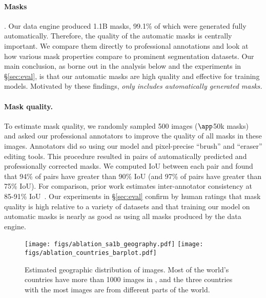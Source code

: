 \paragraph{Masks}. Our data engine produced 1.1B masks, 99.1\% of which were generated fully automatically. Therefore, the quality of the automatic masks is centrally important. We compare them directly to professional annotations and look at how various mask properties compare to prominent segmentation datasets. Our main conclusion, as borne out in the analysis below and the experiments in \S\ref{sec:eval}, is that our automatic masks are high quality and effective for training models. Motivated by these findings, \sad \emph{only includes automatically generated masks.}

\paragraph{Mask quality.} To estimate mask quality, we randomly sampled 500 images ($\app$50k masks) and asked our professional annotators to improve the quality of all masks in these images. Annotators did so using our model and pixel-precise ``brush'' and ``eraser'' editing tools. This procedure resulted in pairs of automatically predicted and professionally corrected masks. We computed IoU between each pair and found that 94\% of pairs have greater than 90\% IoU (and 97\% of pairs have greater than 75\% IoU). For comparison, prior work estimates inter-annotator consistency at 85-91\% IoU~\cite{Gupta2019,OpenImages}. Our experiments in \S\ref{sec:eval} confirm by human ratings that mask quality is high relative to a variety of datasets and that training our model on automatic masks is nearly as good as using all masks produced by the data engine.

\begin{figure*}[t]\centering
\texttt{[image: figs/ablation\_sa1b\_geography.pdf]}\hfill
\texttt{[image: figs/ablation\_countries\_barplot.pdf]}
\vspace{-3mm}
\caption{Estimated geographic distribution of \sad images. Most of the world's countries have more than 1000 images in \sad, and the three countries with the most images are from different parts of the world.}
\label{fig:geo_distribution}\vspace{-4mm}
\end{figure*}

